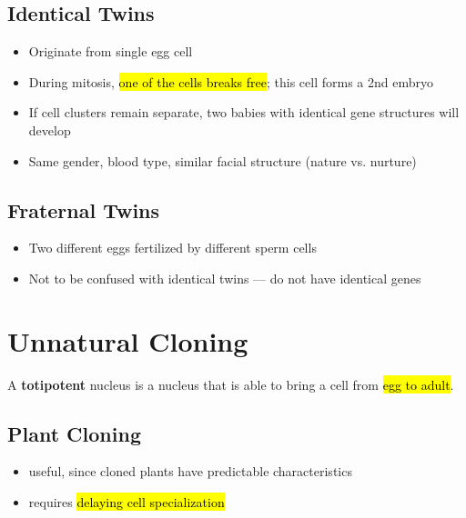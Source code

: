 \documentclass[a4paper,12pt]{article}
\begin{document}
\subsection{Identical Twins}
\begin{itemize}
    \item{Originate from single egg cell}
    \item{During mitosis, \hl{one of the cells breaks free}; this cell forms a 2nd embryo}
    \item{If cell clusters remain separate, two babies with identical gene structures will develop}
    \item{Same gender, blood type, similar facial structure (nature vs. nurture)}
\end{itemize}

\subsection{Fraternal Twins}
\begin{itemize}
    \item{Two different eggs fertilized by different sperm cells}
    \item{Not to be confused with identical twins --- do not have identical genes}
\end{itemize}

\pagebreak

\section{Unnatural Cloning}

A \textbf{totipotent} nucleus is a nucleus that is able to bring a cell from \hl{egg to adult}.

\subsection{Plant Cloning}
\begin{itemize}
    \item{useful, since cloned plants have predictable characteristics}
    \item{requires \hl{delaying cell specialization}}
\end{itemize}
\end{document}
